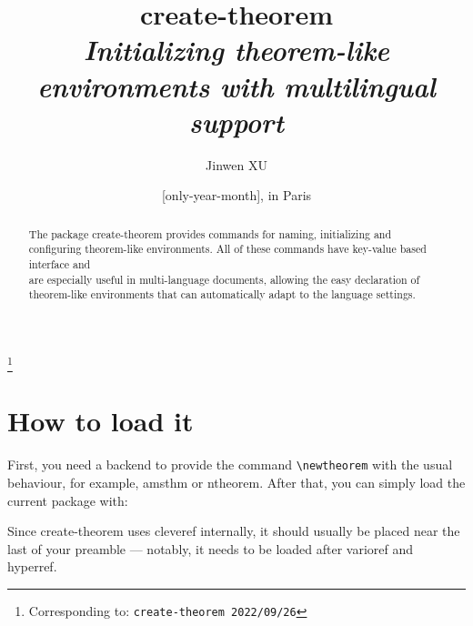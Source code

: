 \documentclass[classical]{einfart}
\newcommand{\meta}[1]{$\langle${\normalfont\itshape#1}$\rangle$}
\newenvironment{tip}[1][Tip]
  {%
    \LocallyStopLineNumbers%
    \begin{tcolorbox}[breakable,
        enhanced,
        width = \textwidth,
        colback = paper, colbacktitle = paper,
        colframe = gray!50, boxrule=0.2mm,
        coltitle = black,
        fonttitle = \sffamily,
        attach boxed title to top left = {yshift=-\tcboxedtitleheight/2, xshift=.5cm},
        boxed title style = {boxrule=0pt, colframe=paper},
        before skip = 3mm,
        after skip = 3mm,
        top = 2.5mm,
        bottom = 1.5mm,
        title={\scshape\sffamily #1}]%
  }
  {%
    \end{tcolorbox}%
    \ResumeLineNumbers%
  }
\newcommand{\createtheorempackage}{\textsf{create-theorem}}
\begin{document}
\def\PackageVersion{2022/09/26}
\def\PackageSubVersion{}

\title{\createtheorempackage{}\\\smallskip\itshape Initializing theorem-like environments with multilingual support}
\author{Jinwen XU}
\thanks{Corresponding to: \texttt{\createtheorempackage{} \PackageVersion\PackageSubVersion}}
\date{\TheDate{\PackageVersion}[only-year-month], in Paris}

\maketitle

\begin{abstract}
    \raggedleft
    The package \createtheorempackage{} provides commands for naming, initializing and configuring theorem-like environments. All of these commands have key-value based interface and \\are especially useful in multi-language documents, allowing the easy declaration of \\theorem-like environments that can automatically adapt to the language settings.
\end{abstract}

\vspace{-.5\baselineskip}



\section{How to load it}

First, you need a backend to provide the command \lstinline|\newtheorem| with the usual behaviour, for example, \textsf{amsthm} or \textsf{ntheorem}. After that, you can simply load the current package with:

\begin{code}
\usepackage[(*\meta{options}*)]{create-theorem}
\end{code}

\begin{tip}[Attention]
    Since \createtheorempackage{} uses \textsf{cleveref} internally, it should usually be placed near the last of your preamble --- notably, it needs to be loaded after \textsf{varioref} and \textsf{hyperref}.
\end{tip}
\end{document}
